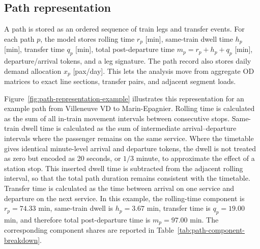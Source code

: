 \documentclass[preprint,12pt]{elsarticle}
\begin{document}
\newpage
\subsection{Path representation}\label{sec:data-path-representation}

A path is stored as an ordered sequence of train legs and transfer events. For each path $p$, the model stores rolling time $r_p$ [min], same-train dwell time $h_p$ [min], transfer time $q_p$ [min], total post-departure time $m_p=r_p+h_p+q_p$ [min], departure/arrival tokens, and a leg signature. The path record also stores daily demand allocation $x_p$ [pax/day]. This lets the analysis move from aggregate OD matrices to exact line sections, transfer pairs, and adjacent segment loads.

Figure~\ref{fig:path-representation-example} illustrates this representation for an example path from Villeneuve VD to Marin-Epagnier. Rolling time is calculated as the sum of all in-train movement intervals between consecutive stops. Same-train dwell time is calculated as the sum of intermediate arrival--departure intervals where the passenger remains on the same service. Where the timetable gives identical minute-level arrival and departure tokens, the dwell is not treated as zero but encoded as 20 seconds, or $1/3$ minute, to approximate the effect of a station stop. This inserted dwell time is subtracted from the adjacent rolling interval, so that the total path duration remains consistent with the timetable. Transfer time is calculated as the time between arrival on one service and departure on the next service. In this example, the rolling-time component is $r_p=74.33$ min, same-train dwell is $h_p=3.67$ min, transfer time is $q_p=19.00$ min, and therefore total post-departure time is $m_p=97.00$ min. The corresponding component shares are reported in Table~\ref{tab:path-component-breakdown}.

\end{document}
